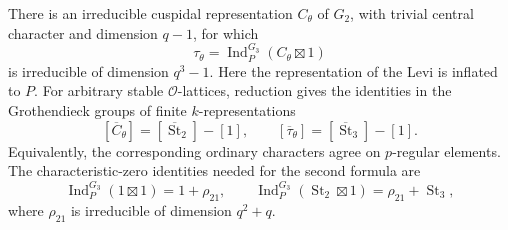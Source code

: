 \begin{proposition}
\label{AC-G72-character}
There is an irreducible cuspidal representation $C_\theta$ of $G_2$,
with trivial central character and dimension $q-1$, for which
\[
 \tau_\theta=\operatorname{Ind}_{P}^{G_3}(C_\theta\boxtimes1)
                                                        \tag{G72C.2}
\]
is irreducible of dimension $q^3-1$.  Here the representation of the
Levi is inflated to $P$.  For arbitrary stable $\mathcal O$-lattices,
reduction gives the identities in the Grothendieck groups of finite
$k$-representations
\[
 [\overline C_\theta]=[\overline{\operatorname{St}}_2]-[1],
 \qquad
 [\overline\tau_\theta]=[\overline{\operatorname{St}}_3]-[1].
                                                        \tag{G72C.3}
\]
Equivalently, the corresponding ordinary characters agree on
$p$-regular elements.  The characteristic-zero identities needed
for the second formula are
\[
 \operatorname{Ind}_{P}^{G_3}(1\boxtimes1)=1+\rho_{21},
 \qquad
 \operatorname{Ind}_{P}^{G_3}(\operatorname{St}_2\boxtimes1)
                     =\rho_{21}+\operatorname{St}_3,     \tag{G72C.4}
\]
where $\rho_{21}$ is irreducible of dimension $q^2+q$.
\end{proposition}
